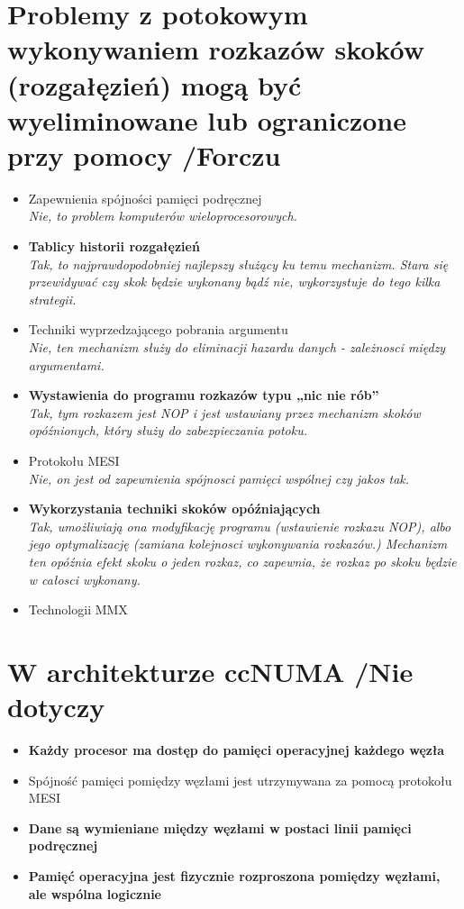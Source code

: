 \documentclass[a4paper,twoside]{article}
\begin{document}
\section{Problemy z potokowym wykonywaniem rozkazów skoków (rozgałęzień) mogą być wyeliminowane lub ograniczone przy pomocy {\small /Forczu}}
	\begin{itemize}
    \item Zapewnienia spójności pamięci podręcznej\\
    {\small \emph{Nie, to problem komputerów wieloprocesorowych.}}
    \item \textbf{Tablicy historii rozgałęzień}\\
    {\small \emph{Tak, to najprawdopodobniej najlepszy służący ku temu mechanizm. Stara się przewidywać czy skok będzie wykonany bądź nie, wykorzystuje do tego kilka strategii.}}
    \item Techniki wyprzedzającego pobrania argumentu\\
    {\small \emph{Nie, ten mechanizm służy do eliminacji hazardu danych - zależnosci między argumentami.}}
    \item \textbf{Wystawienia do programu rozkazów typu „nic nie rób”}\\
    {\small \emph{Tak, tym rozkazem jest \emph{NOP} i jest wstawiany przez mechanizm skoków opóźnionych, który służy do zabezpieczania potoku.}}
    \item Protokołu MESI\\
    {\small \emph{Nie, on jest od zapewnienia spójnosci pamięci wspólnej czy jakos tak.}}
    \item \textbf{Wykorzystania techniki skoków opóźniających}\\
    {\small \emph{Tak, umożliwiają ona modyfikację programu (wstawienie rozkazu NOP), albo jego optymalizację (zamiana kolejnosci wykonywania rozkazów.) Mechanizm ten opóźnia efekt skoku o jeden rozkaz, co zapewnia, że rozkaz po skoku będzie w całosci wykonany.}}
    \item Technologii MMX
    \end{itemize}

\section{W architekturze ccNUMA {\small /Nie dotyczy}}
	\begin{itemize}
    \item \textbf{Każdy procesor ma dostęp do pamięci operacyjnej każdego węzła}
    \item Spójność pamięci pomiędzy węzłami jest utrzymywana za pomocą protokołu MESI
    \item \textbf{Dane są wymieniane między węzłami w postaci linii pamięci podręcznej}
    \item \textbf{Pamięć operacyjna jest fizycznie rozproszona pomiędzy węzłami, ale wspólna logicznie}
    \end{itemize}
\end{document}
